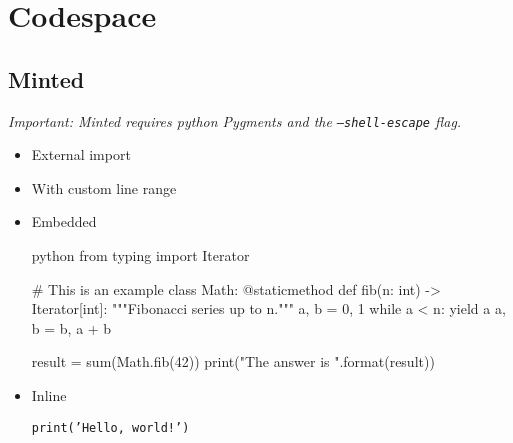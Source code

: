 \section{Codespace}
\subsection{Minted}
\emph{Important: Minted requires python Pygments and the \texttt{--shell-escape} flag.}

\begin{itemize}
  \item External import


  \item With custom line range


  \item Embedded

  \begin{code}{python}
  from typing import Iterator

  # This is an example
  class Math:
      @staticmethod
      def fib(n: int) -> Iterator[int]:
          """Fibonacci series up to n."""
          a, b = 0, 1
          while a < n:
              yield a
              a, b = b, a + b

  result = sum(Math.fib(42))
  print("The answer is {}".format(result))
  \end{code}

  \item Inline

  \texttt{print('Hello, world!')}
\end{itemize}
